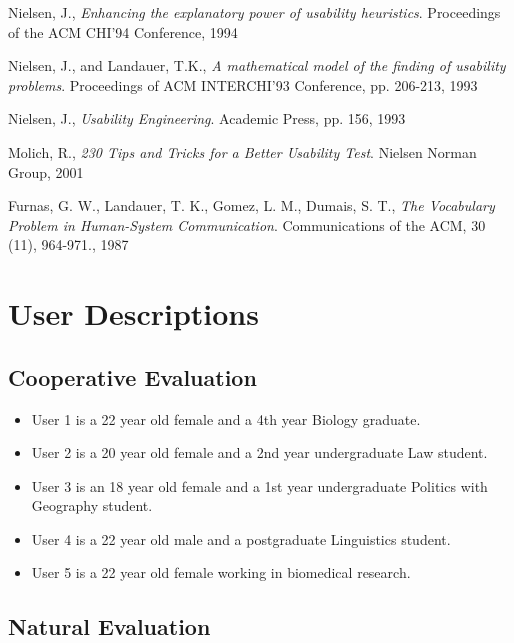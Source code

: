\documentclass[11pt,twocolumn]{article}
\begin{document}
\begin{thebibliography}{9}

  Nielsen, J.,
  \emph{Enhancing the explanatory power of usability heuristics}.
  Proceedings of the ACM CHI'94 Conference,
  1994

  Nielsen, J., and Landauer, T.K.,
  \emph{A mathematical model of the finding of usability problems}.
  Proceedings of ACM INTERCHI'93 Conference, pp. 206-213,
  1993

  Nielsen, J.,
  \emph{Usability Engineering}.
  Academic Press, pp. 156,
  1993

  Molich, R.,
 \emph{230 Tips and Tricks for a Better Usability Test}.
  Nielsen Norman Group,
  2001

 Furnas, G. W., Landauer, T. K., Gomez, L. M., Dumais, S. T.,
 \emph{The Vocabulary Problem in Human-System Communication}. 
  Communications of the ACM, 30 (11), 964-971.,
  1987

\end{thebibliography}

\onecolumn

\appendix
\appendixpage

\section{User Descriptions}

\subsection{Cooperative Evaluation}

\begin{itemize}
\item User 1 is a 22 year old female and a 4th year Biology graduate.
\item User 2 is a 20 year old female and a 2nd year undergraduate Law student. 
\item User 3 is an 18 year old female and a 1st year undergraduate Politics with Geography student. 
\item User 4 is a 22 year old male and a postgraduate Linguistics student. 
\item User 5 is a 22 year old female working in biomedical research. 
\end{itemize}

\subsection{Natural Evaluation}
\end{document}
